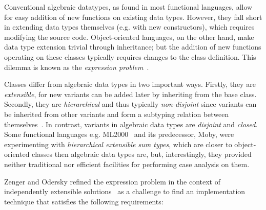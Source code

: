 

Conventional algebraic datatypes, as found in most functional languages, allow 
for easy addition of new functions on existing data types. However, they fall short 
in extending data types themselves (e.g. with new constructors), which requires 
modifying the source code. Object-oriented languages, on the other hand, make 
data type extension trivial through inheritance; but the addition of new 
functions operating on these classes typically requires changes to the class 
definition. This dilemma is known as the \emph{expression problem}~\cite{Cook90,exprproblem}.

Classes differ from algebraic data types in two important ways. Firstly, they
are \emph{extensible}, for new variants can be added later by inheriting from
the base class. Secondly, they are \emph{hierarchical} and thus typically 
\emph{non-disjoint} since variants can be inherited from other variants and form 
a subtyping relation between themselves~\cite{Glew99}. In contrast, variants in 
algebraic data types are \emph{disjoint} and \emph{closed}.
Some functional languages e.g. ML2000~\cite{ML2000} and its predecessor, Moby, 
were experimenting with \emph{hierarchical extensible sum types}, which are 
closer to object-oriented classes then algebraic data types are, but, 
interestingly, they provided neither traditional nor efficient facilities for 
performing case analysis on them.

Zenger and Odersky refined the expression problem in the context of 
independently extensible solutions~\cite{fool12} as a challenge to find an 
implementation technique that satisfies the following requirements:

